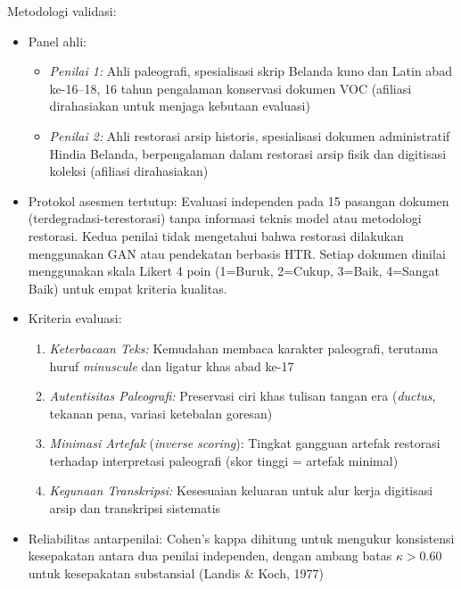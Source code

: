 \documentclass[journal]{IEEEtran}
\begin{document}
Metodologi validasi:
\begin{itemize}
    \item Panel ahli: 
    \begin{itemize}
        \item[$-$] \textit{Penilai 1:} Ahli paleografi, spesialisasi skrip Belanda kuno dan Latin abad ke-16--18, 16 tahun pengalaman konservasi dokumen VOC (afiliasi dirahasiakan untuk menjaga kebutaan evaluasi)
        \item[$-$] \textit{Penilai 2:} Ahli restorasi arsip historis, spesialisasi dokumen administratif Hindia Belanda, berpengalaman dalam restorasi arsip fisik dan digitisasi koleksi (afiliasi dirahasiakan)
    \end{itemize}
    \item Protokol asesmen tertutup: Evaluasi independen pada 15 pasangan dokumen (terdegradasi-terestorasi) tanpa informasi teknis model atau metodologi restorasi. Kedua penilai tidak mengetahui bahwa restorasi dilakukan menggunakan GAN atau pendekatan berbasis HTR. Setiap dokumen dinilai menggunakan skala Likert 4 poin (1=Buruk, 2=Cukup, 3=Baik, 4=Sangat Baik) untuk empat kriteria kualitas.
    \item Kriteria evaluasi:
    \begin{enumerate}
        \item \textit{Keterbacaan Teks:} Kemudahan membaca karakter paleografi, terutama huruf \textit{minuscule} dan ligatur khas abad ke-17
        \item \textit{Autentisitas Paleografi:} Preservasi ciri khas tulisan tangan era (\textit{ductus}, tekanan pena, variasi ketebalan goresan)
        \item \textit{Minimasi Artefak} (\textit{inverse scoring}): Tingkat gangguan artefak restorasi terhadap interpretasi paleografi (skor tinggi = artefak minimal)
        \item \textit{Kegunaan Transkripsi:} Kesesuaian keluaran untuk alur kerja digitisasi arsip dan transkripsi sistematis
    \end{enumerate}
    \item Reliabilitas antarpenilai: Cohen's kappa dihitung untuk mengukur konsistensi kesepakatan antara dua penilai independen, dengan ambang batas $\kappa > 0.60$ untuk kesepakatan substansial (Landis \& Koch, 1977)
\end{itemize}
\end{document}

